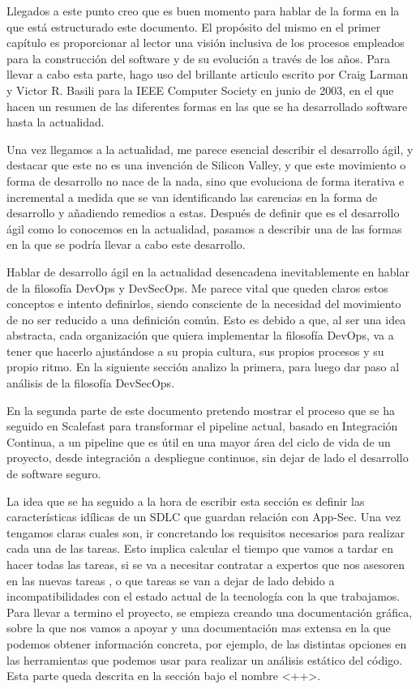 \documentclass[12pt]{report} %
\begin{document}
Llegados a este punto creo que es buen momento para hablar de la forma en la 
que está estructurado este documento.
El propósito del mismo en el primer capítulo es proporcionar al lector una
visión inclusiva de los procesos empleados para la construcción del software y
de su evolución a través de los años.
Para llevar a cabo esta parte, hago uso del brillante articulo escrito por 
Craig Larman y Victor R. Basili para la IEEE Computer Society en junio de 2003,
en el que hacen un resumen de las diferentes formas en las que se ha 
desarrollado software hasta la actualidad.

Una vez llegamos a la actualidad, me parece esencial describir el desarrollo
ágil, y destacar que este no es una invención de Silicon Valley, y que este
movimiento o forma de desarrollo no nace de la nada, sino que evoluciona de
forma iterativa e incremental a medida que se van identificando las carencias 
en la forma de desarrollo y añadiendo remedios a estas.
Después de definir que es el desarrollo ágil como lo conocemos en la actualidad,
pasamos a describir una de las formas en la que se podría llevar a cabo este
desarrollo. 

Hablar de desarrollo ágil en la actualidad desencadena
inevitablemente en hablar de la filosofía \gls{DevOps} y \gls{DevSecOps}.
Me parece vital que queden claros estos conceptos e intento definirlos, siendo
consciente de la necesidad del movimiento de no ser reducido a una definición
común.
Esto es debido a que, al ser una idea abstracta, cada organización que quiera
implementar la filosofía DevOps, va a tener que hacerlo ajustándose a su propia
cultura, sus propios procesos y su propio ritmo.
En la siguiente sección analizo la primera, para luego dar paso al análisis de
la filosofía \gls{DevSecOps}.

En la segunda parte de este documento pretendo mostrar el proceso que se ha
seguido en Scalefast para transformar el pipeline actual, basado en Integración
Continua, a un \gls{pipeline} que es útil en una mayor área del ciclo de vida
de un proyecto, desde integración a despliegue continuos, sin dejar de lado el
desarrollo de software seguro.

La idea que se ha seguido a la hora de escribir esta sección es definir las
características idílicas de un \gls{SDLC} que guardan relación con \gls{App-Sec}.
Una vez tengamos claras cuales son, ir concretando los requisitos necesarios
para realizar cada una de las tareas.
Esto implica calcular el tiempo que vamos a tardar en hacer todas las tareas, 
si se va a necesitar contratar a expertos que nos asesoren en las nuevas tareas
, o que tareas se van a dejar de lado debido a incompatibilidades con el estado
actual de la tecnología con la que trabajamos.
Para llevar a termino el proyecto, se empieza creando una documentación 
gráfica, sobre la que nos vamos a apoyar y una documentación mas extensa en la
que podemos obtener información concreta, por ejemplo, de las distintas 
opciones en las herramientas que podemos usar para realizar un análisis 
estático del código.
Esta parte queda descrita en la sección bajo el nombre <++>. 
\end{document}
